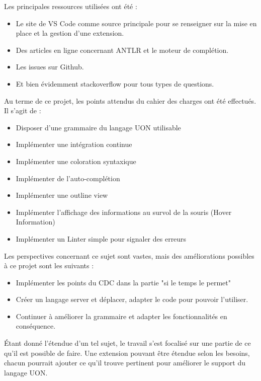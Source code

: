 Les principales ressources utilisées ont été :
\begin{itemize}
    \item Le site de VS Code comme source principale pour se renseigner sur la mise en place et la gestion d'une extension.
    \item Des articles en ligne concernant ANTLR et le moteur de complétion.
    \item Les issues sur Github.
    \item Et bien évidemment stackoverflow pour tous types de questions.
\end{itemize}


Au terme de ce projet, les points attendus du cahier des charges ont été effectués. Il s'agit de :
\begin{itemize}
    \item Disposer d'une grammaire du langage UON utilisable
    \item Implémenter une intégration continue
    \item Implémenter une coloration syntaxique
    \item Implémenter de l'auto-complétion
    \item Implémenter une outline view
    \item Implémenter l'affichage des informations au survol de la souris (Hover Information)
    \item Implémenter un Linter simple pour signaler des erreurs
\end{itemize}

Les perspectives concernant ce sujet sont vastes, mais des améliorations possibles à ce projet sont les suivants :
\begin{itemize}
    \item Implémenter les points du CDC dans la partie "si le temps le permet"
    \item Créer un langage server et déplacer, adapter le code pour pouvoir l'utiliser.
    \item Continuer à améliorer la grammaire et adapter les fonctionnalités en conséquence.
\end{itemize}

Étant donné l'étendue d'un tel sujet, le travail s'est focalisé sur une partie de ce qu'il est possible de faire.
Une extension pouvant être étendue selon les besoins, chacun pourrait ajouter ce qu'il trouve pertinent pour améliorer le support du langage UON.